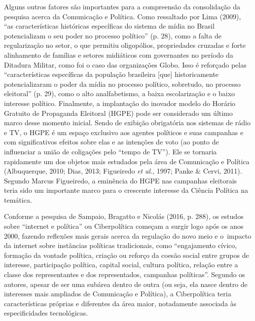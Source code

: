 Alguns outros fatores são importantes para a compreensão da consolidação
da pesquisa acerca da Comunicação e Política. Como ressaltado por Lima
(2009), ``as características históricas específicas do sistema de mídia
no Brasil potencializam o seu poder no processo político'' (p. 28), como
a falta de regularização no setor, o que permitiu oligopólios,
propriedades cruzadas e forte alinhamento de famílias e setores
midiáticos com governantes no período da Ditadura Militar, como foi o
caso das organizações Globo. Isso é reforçado pelas ``características
específicas da população brasileira {[}que{]} historicamente
potencializaram o poder da mídia no processo político, sobretudo, no
processo eleitoral'' (p. 29), como o alto analfabetismo, a baixa
escolarização e o baixo interesse político. Finalmente, a implantação do
inovador modelo do Horário Gratuito de Propaganda Eleitoral (HGPE) pode
ser considerado um último marco desse momento inicial. Sendo de exibição
obrigatória nos sistemas de rádio e TV, o HGPE é um espaço exclusivo aos
agentes políticos e suas campanhas e com significativos efeitos sobre
elas e as intenções de voto (ao ponto de influenciar a união de
coligações pelo ``tempo de TV''). Ele se tornaria rapidamente um dos
objetos mais estudados pela área de Comunicação e Política (Albuquerque,
2010; Dias, 2013; Figueiredo \emph{et al.}, 1997; Panke \& Cervi, 2011).
Segundo Marcus Figueiredo, a eminência do HGPE nas campanhas eleitorais
teria sido um importante marco para o crescente interesse da Ciência
Política na temática.

Conforme a pesquisa de Sampaio, Bragatto e Nicolás (2016, p. 288), os
estudos sobre ``internet e política'' ou Ciberpolítica começam a surgir
logo após os anos 2000, fazendo reflexões mais gerais acerca da
regulação do novo meio e o~impacto da internet sobre instâncias
políticas tradicionais, como ``engajamento cívico, formação da vontade
política, criação ou reforço da coesão social entre grupos de interesse,
participação política, capital social, cultura política, relação entre a
classe dos representantes e dos representados, campanhas políticas''.
Segundo os autores, apesar de ser uma subárea dentro de outra (ou seja,
ela nasce dentro de interesses mais ampliados de Comunicação e
Política), a Ciberpolítica teria características próprias e diferentes
da área maior, notadamente associada às especificidades tecnológicas.

